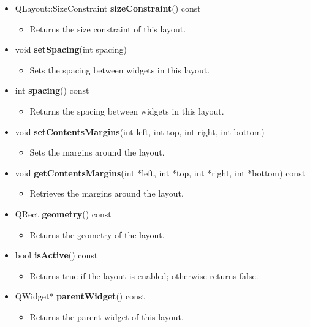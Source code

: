 \documentclass{report}
\begin{document}
\begin{enumerate}[label=\textbf{\arabic*.}]
\begin{itemize}
        \item QLayout::SizeConstraint \textbf{sizeConstraint}() const
        \begin{itemize}
            \item Returns the size constraint of this layout.
        \end{itemize}
        
        \item void \textbf{setSpacing}(int spacing)
        \begin{itemize}
            \item Sets the spacing between widgets in this layout.
        \end{itemize}
        
        \item int \textbf{spacing}() const
        \begin{itemize}
            \item Returns the spacing between widgets in this layout.
        \end{itemize}
        
        \item void \textbf{setContentsMargins}(int left, int top, int right, int bottom)
        \begin{itemize}
            \item Sets the margins around the layout.
        \end{itemize}
        
        \item void \textbf{getContentsMargins}(int *left, int *top, int *right, int *bottom) const
        \begin{itemize}
            \item Retrieves the margins around the layout.
        \end{itemize}
        
        \item QRect \textbf{geometry}() const
        \begin{itemize}
            \item Returns the geometry of the layout.
        \end{itemize}
        
        \item bool \textbf{isActive}() const
        \begin{itemize}
            \item Returns true if the layout is enabled; otherwise returns false.
        \end{itemize}
        
        \item QWidget* \textbf{parentWidget}() const
        \begin{itemize}
            \item Returns the parent widget of this layout.
        \end{itemize}
        \end{itemize}
    \end{enumerate}
\end{document}
